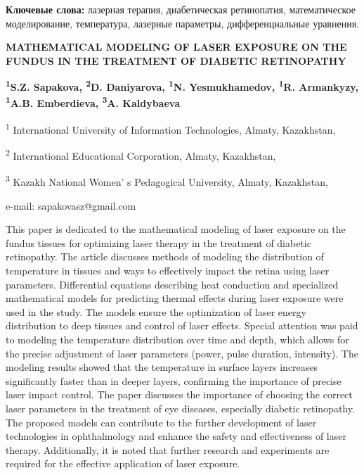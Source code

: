 {\bfseries Ключевые слова:} лазерная терапия, диабетическая ретинопатия,
математическое моделирование, температура, лазерные параметры,
дифференциальные уравнения.

\begin{articleheader}
{\bfseries MATHEMATICAL MODELING OF LASER EXPOSURE ON THE FUNDUS IN THE
TREATMENT OF DIABETIC RETINOPATHY}

{\bfseries
\textsuperscript{1}S.Z. Sapakova\textsuperscript{\envelope },
\textsuperscript{2}D. Daniyarova,
\textsuperscript{1}N. Yesmukhamedov,
\textsuperscript{1}R. Armankyzy,
\textsuperscript{1}A.B. Emberdieva,
\textsuperscript{3}A. Kaldybaeva
}
\end{articleheader}

\begin{affiliation}
\textsuperscript{1} International University of Information Technologies, Almaty, Kazakhstan,

\textsuperscript{2} International Educational Corporation, Almaty, Kazakhstan,

\textsuperscript{3} Kazakh National Women' s Pedagogical University, Almaty, Kazakhstan,

e-mail: sapakovasz@gmail.com
\end{affiliation}

This paper is dedicated to the mathematical modeling of laser exposure
on the fundus tissues for optimizing laser therapy in the treatment of
diabetic retinopathy. The article discusses methods of modeling the
distribution of temperature in tissues and ways to effectively impact
the retina using laser parameters. Differential equations describing
heat conduction and specialized mathematical models for predicting
thermal effects during laser exposure were used in the study. The models
ensure the optimization of laser energy distribution to deep tissues and
control of laser effects. Special attention was paid to modeling the
temperature distribution over time and depth, which allows for the
precise adjustment of laser parameters (power, pulse duration,
intensity). The modeling results showed that the temperature in surface
layers increases significantly faster than in deeper layers, confirming
the importance of precise laser impact control. The paper discusses the
importance of choosing the correct laser parameters in the treatment of
eye diseases, especially diabetic retinopathy. The proposed models can
contribute to the further development of laser technologies in
ophthalmology and enhance the safety and effectiveness of laser therapy.
Additionally, it is noted that further research and experiments are
required for the effective application of laser exposure.

